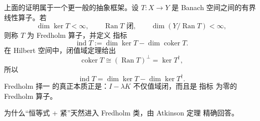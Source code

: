 上面的证明属于一个更一般的抽象框架。设 $T:X\to Y$ 是 Banach 空间之间的有界线性算子。若
\begin{equation*}\dim\ker T<\infty,
\qquad
\operatorname{Ran}T\text{ 闭},
\qquad
\dim(Y/\operatorname{Ran}T)<\infty,\end{equation*}
则称 $T$ 为 Fredholm 算子，并定义 指标
\begin{equation*}\boxed{
\operatorname{ind}T
:=\dim\ker T-\dim\operatorname{coker}T.
}\end{equation*}
在 Hilbert 空间中，闭值域定理给出
\[
\operatorname{coker}T
\cong(\operatorname{Ran}T)^\perp
=\ker T^\dagger,
\]
所以
\begin{equation*}\operatorname{ind}T
=\dim\ker T-\dim\ker T^\dagger.\end{equation*}
Fredholm 择一 的真正本质正是：$I-\lambda K$ 不仅值域闭，而且是 指标 为零的 Fredholm 算子。

为什么“恒等式 + 紧”天然进入 Fredholm 类，由 Atkinson 定理 精确回答。



